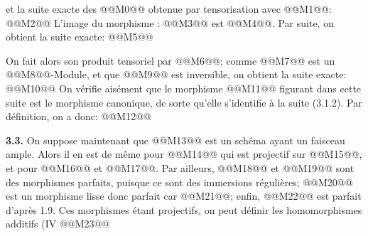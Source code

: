 
et la
suite exacte des @@M0@@ obtenue par tensorisation avec @@M1@@:
@@M2@@
L'image du morphisme : @@M3@@ est
@@M4@@. Par suite, on obtient la suite exacte:
@@M5@@

On fait alors son produit tensoriel par @@M6@@; comme
@@M7@@ est un @@M8@@-Module, et que
@@M9@@ est inversible, on obtient la suite exacte:
@@M10@@
On vérifie aisément que le morphisme @@M11@@ figurant dans cette suite est le morphisme canonique, de sorte qu'elle s'identifie à la suite (3.1.2). Par définition, on a donc:
@@M12@@

\textbf{3.3.} On suppose maintenant que @@M13@@ est un schéma ayant un faisceau ample. Alors il en est de même pour @@M14@@ qui est projectif sur @@M15@@, et pour @@M16@@ et @@M17@@. Par ailleurs, @@M18@@ et @@M19@@ sont des morphismes parfaits, puisque ce sont des immersions régulières; @@M20@@ est un morphisme lisse donc parfait car @@M21@@; enfin, @@M22@@ est parfait d'après 1.9. Ces morphismes étant projectifs, on peut définir les homomorphismes additifs (IV
@@M23@@

